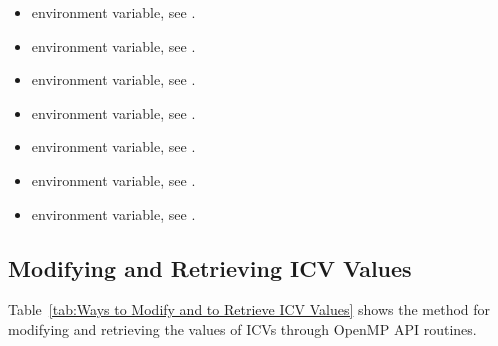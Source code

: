 \begin{itemize}
\item {} environment variable, see .

\item {} environment variable, see .

\item {} environment variable, see .

\item {} environment variable, see .

\item {} environment variable, see .

\item {} environment variable, see .

\item {} environment variable, see .
\end{itemize}








\subsection{Modifying and Retrieving ICV Values}
\label{subsec:Modifying and Retrieving ICV Values}
Table~\ref{tab:Ways to Modify and to Retrieve ICV Values} shows the method for modifying and retrieving the values of ICVs
through OpenMP API routines.


